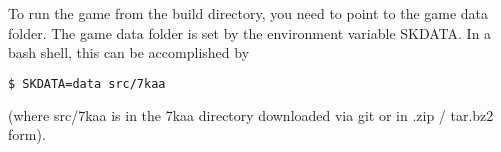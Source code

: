 
To run the game from the build directory, you need to point to the game data folder. The game data folder is set by the environment variable SKDATA. In a bash shell, this can be accomplished by

\begin{lstlisting}[language=bash] 
$ SKDATA=data src/7kaa 
\end{lstlisting}

(where src/7kaa is in the 7kaa directory downloaded via git or in .zip / tar.bz2 form).






